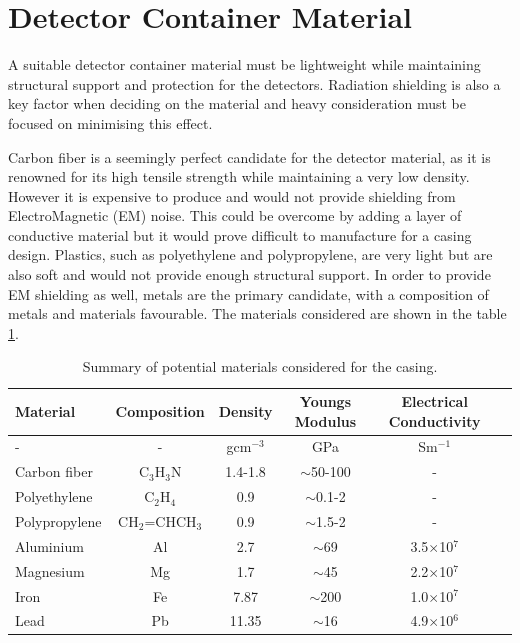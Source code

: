 \section{Detector Container Material}
A suitable detector container material must be lightweight while maintaining structural support and protection for the detectors. Radiation shielding is also a key factor when deciding on the material and heavy consideration must be focused on minimising this effect. 

Carbon fiber is a seemingly perfect candidate for the detector material, as it is renowned for its high tensile strength while maintaining a very low density. However it is expensive to produce and would not provide shielding from ElectroMagnetic (EM) noise. This could be overcome by adding a layer of conductive material but it would prove difficult to manufacture for a casing design. Plastics, such as polyethylene and polypropylene, are very light but are also soft and would not provide enough structural support. In order to provide EM shielding as well, metals are the primary candidate, with a composition of metals and materials favourable. The materials considered are shown in the table \ref{tab:casingMaterials}.

\begin{table}[!htbp]
\begin{center}
	\begin{tabular}{l*{4}{c}r}
	\hline
	 \hline
	 Material & Composition & Density & Youngs Modulus & Electrical Conductivity \\
    	\hline
   	- & - & gcm$^{-3}$ & GPa & Sm$^{-1}$ \\
    	\hline
    	Carbon fiber & C$_{3}$H$_{3}$N & 1.4-1.8 & $\sim$50-100 & - \\
    	Polyethylene & C$_{2}$H$_{4}$ & 0.9 & $\sim$0.1-2 & - \\
    	Polypropylene & CH$_{2}$=CHCH$_{3}$ & 0.9 & $\sim$1.5-2 & - \\
    	Aluminium & Al & 2.7 & $\sim$69 &  3.5$\times$10$^{7}$ \\
    	Magnesium & Mg & 1.7 & $\sim$45 &  2.2$\times$10$^{7}$ \\
    	Iron & Fe & 7.87 & $\sim$200 &  1.0$\times$10$^{7}$\\
    	Lead & Pb & 11.35 & $\sim$16 &  4.9$\times$10$^{6}$ \\
    	\hline
    	\hline
  	\end{tabular}
	\caption{Summary of potential materials considered for the casing.}
    	\label{tab:casingMaterials}
\end{center}
\end{table}

